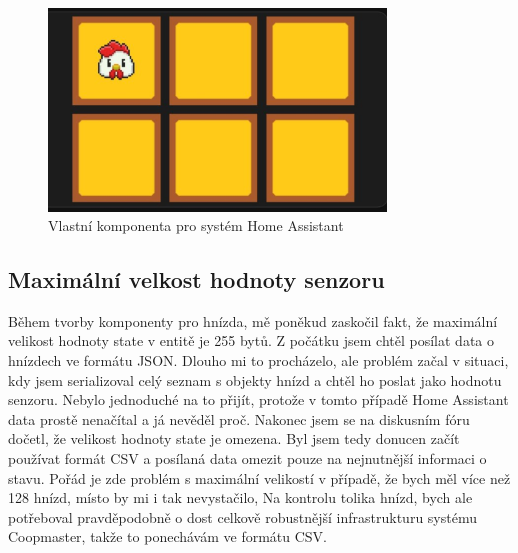 \begin{figure}[H]
    \centering
    \includegraphics[width=0.8\textwidth]{img/homeassitant_custom_component}
    \caption{Vlastní komponenta pro systém Home Assistant}
    \label{fig:homeassitant_custom_component}
\end{figure}



\subsection*{Maximální velkost hodnoty senzoru}
Během tvorby komponenty pro hnízda, mě poněkud zaskočil fakt, že maximální velikost hodnoty state v entitě je 255 bytů.
Z počátku jsem chtěl posílat data o hnízdech ve formátu JSON.
Dlouho mi to procházelo, ale problém začal v situaci, kdy jsem serializoval celý seznam s objekty hnízd a chtěl ho poslat jako hodnotu senzoru.
Nebylo jednoduché na to přijít, protože v tomto případě Home Assistant data prostě nenačítal a já nevěděl proč.
Nakonec jsem se na diskusním fóru dočetl, že velikost hodnoty state je omezena.
Byl jsem tedy donucen začít používat formát CSV a posílaná data omezit pouze na nejnutnější informaci o stavu.
Pořád je zde problém s maximální velikostí v případě, že bych měl více než 128 hnízd, místo by mi i tak nevystačilo,
Na kontrolu tolika hnízd, bych ale potřeboval pravděpodobně o dost celkově robustnější infrastrukturu systému Coopmaster, takže to ponechávám ve formátu CSV.



